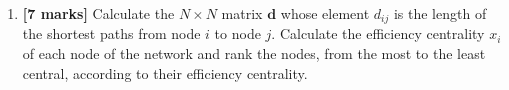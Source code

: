 \documentclass[11pt,a4paper]{article}
\begin{document}
\begin{enumerate}[label=\textbf{(\alph*)}, leftmargin=*, itemsep=1.1em]
\item \textbf{[7 marks]}
Calculate the $N \times N$ matrix $\mathbf{d}$ whose element $d_{ij}$ is the length of the shortest paths from node $i$ to node $j$. Calculate the efficiency centrality $x_i$ of each node of the network and rank the nodes, from the most to the least central, according to their efficiency centrality.

\end{enumerate}
\end{document}
